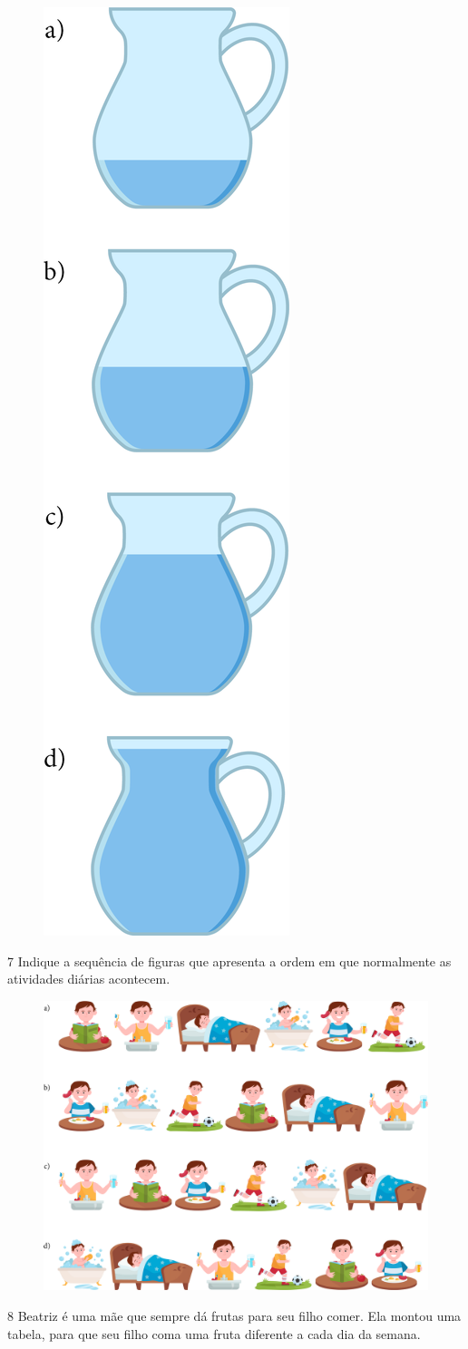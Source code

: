 \begin{figure}[H]
\includegraphics[width=.2\textwidth]{./media/image141.png}
\end{figure}

\num{7} Indique a sequência de figuras que apresenta a ordem em que normalmente as
atividades diárias acontecem.

\begin{figure}[H]
\includegraphics[width=\textwidth]{./media/image142.png}
\end{figure}


\num{8} Beatriz é uma mãe que sempre dá frutas para seu filho comer. Ela
montou uma tabela, para que seu filho coma uma fruta diferente a cada
dia da semana.

